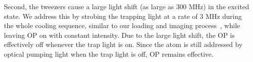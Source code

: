 \documentclass[aps,prl,twocolumn,groupedaddress]{revtex4-1}
\begin{document}
Second, the tweezers cause a large light shift (as large as $300$ MHz)
in the excited state. %
We address this by strobing the trapping light at a rate of 3 MHz during the whole cooling sequence,
similar to our loading and imaging process~\cite{Hutzler2017-LightShifts},
while leaving OP on with constant intensity.
Due to the large light shift, the OP is effectively off whenever the trap light is on.
Since the atom is still addressed by optical pumping light when the trap light is off, OP remains effective.
\end{document}
